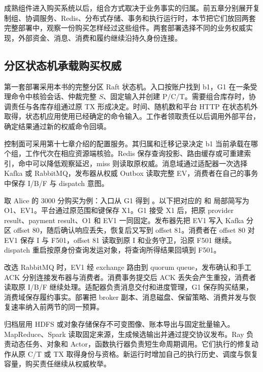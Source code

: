 成熟组件进入购买系统以后，组合方式取决于业务事实的归属。前五章分别展开复制组、协调服务、Redis、分布式存储、事务和执行运行时，本节把它们放回两套完整部署中，观察一份购买怎样经过这些组件。两套部署选择不同的业务权威实现，外部资金、消息、消费和履约继续沿持久身份连接。

\subsection{分区状态机承载购买权威}

第一套部署采用本书的完整分区 Raft 状态机。入口按账户找到 b1，G1 在一条受理命令中核验会话、仲裁完整 $S$、固定输入并创建 P/C/T。需要组合库存时，协调责任与各库存组通过原 TX 形成决定。时间、随机数和平台 HTTP 在状态机外取得，状态机应用使用已经确定的命令输入。工作者领取责任以后调用外部平台，确定结果通过新的权威命令回填。


控制面可采用第十七章介绍的配置服务。其归属和迁移记录决定 b1 当前承载在哪个组，工作代次在相应资源端核验。Redis 保存查询投影、路由缓存或可重建索引，命中可以降低观察延迟，miss 则读取原权威。消息域通过适配器一次选择 Kafka 或 RabbitMQ，发布器从权威 Outbox 读取完整 EV，消费者在自己的事务中保存 I/B/F 与 dispatch 意图。

取 Alice 的 3000 分购买为例：入口从 G1 得到 。以下把对应的  和  局部简写为 O1、EV1。平台通过原范围和键保存 X1。G1 接受 X1 后，把原 provider result、payment result、O1 和 EV1 一同固定。发布器先把 EV1 写入 Kafka 分区 offset 80，随后确认响应丢失，恢复后又写到 offset 81。消费者在 offset 80 对 EV1 保存 I 与 F501，offset 81 读取到原 I 和业务守卫，沿原 F501 继续。dispatch 重启按原身份查询发运对象，将查询所得结果回填到 F501。

改选 RabbitMQ 时，EV1 经 exchange 路由到 quorum queue，发布确认和手工 ACK 分别连接发布器与消费者。消费事务提交后 ACK 丢失会产生重投，消费者读取原 I/B/F 继续处理。适配器负责消息交付和进度管理，G1 保存购买结果，消费域保存履约事实。部署把 broker 副本、消息磁盘、保留策略、消费并发与恢复速率纳入前两节的同一预算。

归档层用 HDFS 或对象存储保存不可变图像、账本导出与固定批量输入。MapReduce、Spark 读取固定来源，生成候选输出并通过提交协议发布。Ray 负责动态任务、对象和 Actor，函数执行器负责短生命周期调用。它们执行的修复动作从原 C/T 或 TX 取得身份与资格。新运行时增加自己的执行历史、调度与恢复容量，购买责任继续从权威枚举。

